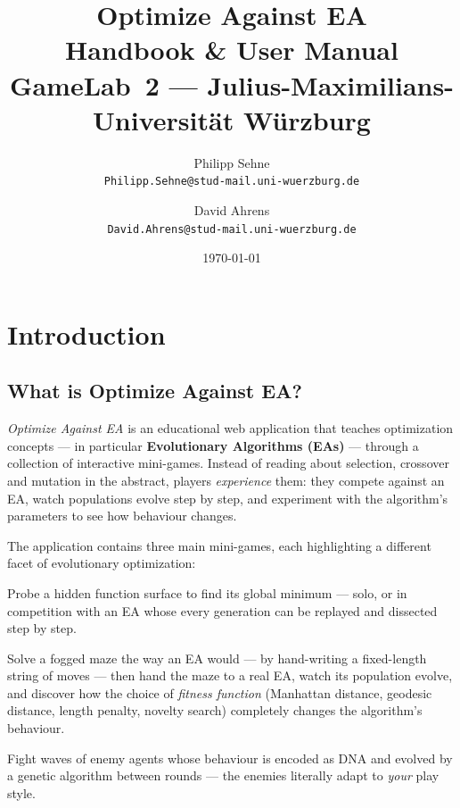 \documentclass[11pt,a4paper]{report}
\title{\Huge\textbf{Optimize Against EA}\\[1ex]
       \LARGE Handbook \& User Manual\\[2ex]
       \large GameLab~2 --- Julius-Maximilians-Universität Würzburg}
\author{Philipp Sehne \\ \small\texttt{Philipp.Sehne@stud-mail.uni-wuerzburg.de}
   \and David Ahrens  \\ \small\texttt{David.Ahrens@stud-mail.uni-wuerzburg.de}}
\date{\today}
\newcommand{\route}[1]{\texttt{#1}}          %
\begin{document}
\maketitle
\tableofcontents

\chapter{Introduction}

\section{What is Optimize Against EA?}

\emph{Optimize Against EA} is an educational web application that teaches
optimization concepts --- in particular \textbf{Evolutionary Algorithms (EAs)}
--- through a collection of interactive mini-games. Instead of reading about
selection, crossover and mutation in the abstract, players \emph{experience}
them: they compete against an EA, watch populations evolve step by step, and
experiment with the algorithm's parameters to see how behaviour changes.

The application contains three main mini-games, each highlighting a different
facet of evolutionary optimization:

\begin{description}[style=nextline]
  \item[Peak Finder (\route{/PeakFinder})]
    Probe a hidden function surface to find its global minimum --- solo, or
    in competition with an EA whose every generation can be replayed and
    dissected step by step.
  \item[Maze Explorer (\route{/MazeExplorer})]
    Solve a fogged maze the way an EA would --- by hand-writing a fixed-length
    string of moves --- then hand the maze to a real EA, watch its population
    evolve, and discover how the choice of \emph{fitness function} (Manhattan
    distance, geodesic distance, length penalty, novelty search) completely
    changes the algorithm's behaviour.
  \item[Shooter Game (\route{/ShooterGame})]
    Fight waves of enemy agents whose behaviour is encoded as DNA and evolved
    by a genetic algorithm between rounds --- the enemies literally adapt to
    \emph{your} play style.
\end{description}
\end{document}
